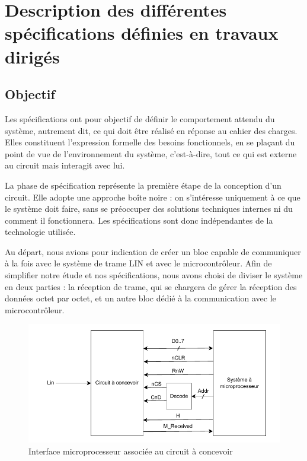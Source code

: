 \section{Description des différentes spécifications définies en travaux dirigés}

\subsection*{Objectif}

Les spécifications ont pour objectif de définir le comportement attendu du système, autrement dit, 
ce qui doit être réalisé en réponse au cahier des charges. Elles constituent l'expression formelle 
des besoins fonctionnels, en se plaçant du point de vue de l'environnement du système,
c'est-à-dire, tout ce qui est externe au circuit mais interagit avec lui.
\newline

La phase de spécification représente la première étape de la conception d'un circuit. Elle adopte
une approche boîte noire : on s'intéresse uniquement à ce que le système doit faire, sans se 
préoccuper des solutions techniques internes ni du comment il fonctionnera. Les spécifications 
sont donc indépendantes de la technologie utilisée.
\newline

Au départ, nous avions pour indication de créer un bloc capable de communiquer à la fois avec 
le système de trame LIN et avec le microcontrôleur. Afin de simplifier notre étude et nos 
spécifications, nous avons choisi de diviser le système en deux parties : la réception de 
trame, qui se chargera de gérer la réception des données octet par octet, et un autre bloc dédié à 
la communication avec le microcontrôleur.
\newline

\begin{figure}[H]
   \centering
   \includegraphics[width=0.8\linewidth]{images/CDC/Schema_cdc_final.pdf}
   \caption{Interface microprocesseur associée au circuit à concevoir}
   \label{fig:placeholder}
\end{figure}
    

